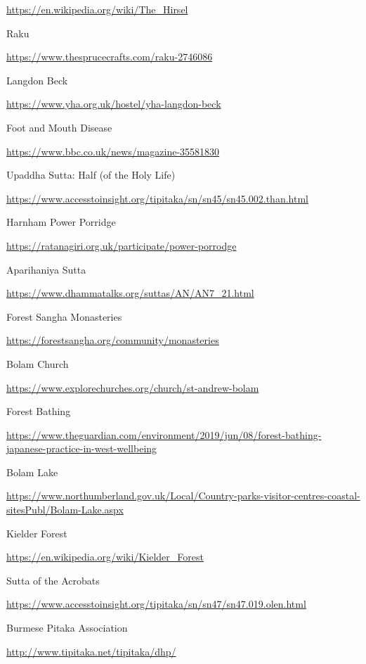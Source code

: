 \begin{thebibliography}{9}
  {\urlsize \url{https://en.wikipedia.org/wiki/The_Hirsel}}

 Raku

  {\urlsize \url{https://www.thesprucecrafts.com/raku-2746086}}

 Langdon Beck

  {\urlsize \url{https://www.yha.org.uk/hostel/yha-langdon-beck}}

 Foot and Mouth Disease

  {\urlsize \url{https://www.bbc.co.uk/news/magazine-35581830}}

 Upaddha Sutta: Half (of the Holy Life)

  {\urlsize \url{https://www.accesstoinsight.org/tipitaka/sn/sn45/sn45.002.than.html}}

 Harnham Power Porridge

  {\urlsize \url{https://ratanagiri.org.uk/participate/power-porrodge}}

 Aparihaniya Sutta

  {\urlsize \url{https://www.dhammatalks.org/suttas/AN/AN7_21.html}}

 Forest Sangha Monasteries

  {\urlsize \url{https://forestsangha.org/community/monasteries}}

 Bolam Church

  {\urlsize \url{https://www.explorechurches.org/church/st-andrew-bolam}}

 Forest Bathing

  {\urlsize \url{https://www.theguardian.com/environment/2019/jun/08/forest-bathing-japanese-practice-in-west-wellbeing}}

 Bolam Lake

  {\urlsize \url{https://www.northumberland.gov.uk/Local/Country-parks-visitor-centres-coastal-sitesPubl/Bolam-Lake.aspx}}

 Kielder Forest

  {\urlsize \url{https://en.wikipedia.org/wiki/Kielder_Forest}}

 Sutta of the Acrobats

  {\urlsize \url{https://www.accesstoinsight.org/tipitaka/sn/sn47/sn47.019.olen.html}}

 Burmese Pitaka Association

  {\urlsize \url{http://www.tipitaka.net/tipitaka/dhp/}}


\end{thebibliography}
